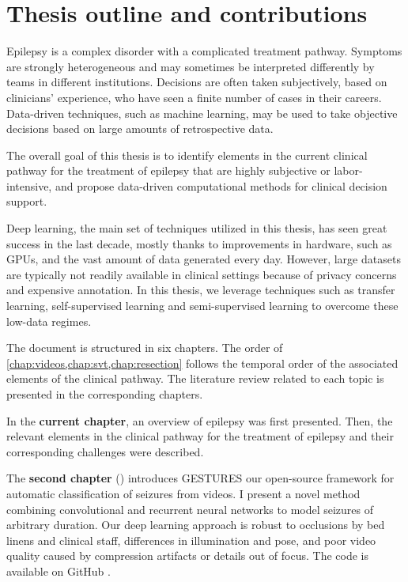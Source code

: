 \section{Thesis outline and contributions}


Epilepsy is a complex disorder with a complicated treatment pathway.
Symptoms are strongly heterogeneous and may sometimes be interpreted differently by teams in different institutions.
Decisions are often taken subjectively, based on clinicians' experience, who have seen a finite number of cases in their careers.
Data-driven techniques, such as machine learning, may be used to take objective decisions based on large amounts of retrospective data.

The overall goal of this thesis is to identify elements in the current clinical pathway for the treatment of epilepsy that are highly subjective or labor-intensive, and propose data-driven computational methods for clinical decision support.

Deep learning, the main set of techniques utilized in this thesis, has seen great success in the last decade, mostly thanks to improvements in hardware, such as \acp{GPU}, and the vast amount of data generated every day.
However, large datasets are typically not readily available in clinical settings because of privacy concerns and expensive annotation.
In this thesis, we leverage techniques such as transfer learning, self-supervised learning and semi-supervised learning to overcome these low-data regimes.

The document is structured in six chapters.
The order of \cref{chap:videos,chap:svt,chap:resection} follows the temporal order of the associated elements of the clinical pathway.
The literature review related to each topic is presented in the corresponding chapters.


In the \textbf{current chapter}, an overview of epilepsy was first presented.
Then, the relevant elements in the clinical pathway for the treatment of epilepsy and their corresponding challenges were described.


The \textbf{second chapter} () introduces \ac{GESTURES} our open-source framework for automatic classification of seizures from videos.
I present a novel method combining convolutional and recurrent neural networks to model seizures of arbitrary duration.
Our deep learning approach is robust to occlusions by bed linens and clinical staff, differences in illumination and pose, and poor video quality caused by compression artifacts or details out of focus.
The code is available on GitHub%
.


